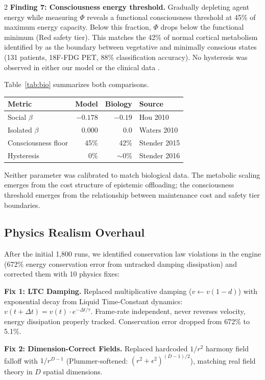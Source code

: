 \documentclass[letterpaper]{article}
\begin{document}
\begin{multicols}{2}
\textbf{Finding 7: Consciousness energy threshold.} Gradually depleting agent energy while measuring $\Phi$ reveals a functional consciousness threshold at 45\% of maximum energy capacity. Below this fraction, $\Phi$ drops below the functional minimum (Red safety tier). This matches the 42\% of normal cortical metabolism identified by \citet{stender2015} as the boundary between vegetative and minimally conscious states (131 patients, 18F-FDG PET, 88\% classification accuracy). No hysteresis was observed in either our model or the clinical data \citep{stender2016}.

Table~\ref{tab:bio} summarizes both comparisons.

\begingroup
\centering
\small
{}
\label{tab:bio}
\begin{tabular}{lrrl}
\toprule
Metric & Model & Biology & Source \\
\midrule
Social $\beta$ & $-0.178$ & $-0.19$ & Hou 2010 \\
Isolated $\beta$ & $0.000$ & $0.0$ & Waters 2010 \\
Consciousness floor & 45\% & 42\% & Stender 2015 \\
Hysteresis & 0\% & $\sim$0\% & Stender 2016 \\
\bottomrule
\end{tabular}
\endgroup

Neither parameter was calibrated to match biological data. The metabolic scaling emerges from the cost structure of epistemic offloading; the consciousness threshold emerges from the relationship between maintenance cost and safety tier boundaries.

\subsection{Physics Realism Overhaul}

After the initial 1,800 runs, we identified conservation law violations in the engine (672\% energy conservation error from untracked damping dissipation) and corrected them with 10 physics fixes:

\textbf{Fix 1: LTC Damping.} Replaced multiplicative damping ($v \leftarrow v(1-d)$) with exponential decay from Liquid Time-Constant dynamics: $v(t+\Delta t) = v(t) \cdot e^{-\Delta t/\tau}$. Frame-rate independent, never reverses velocity, energy dissipation properly tracked. Conservation error dropped from 672\% to 5.1\%.

\textbf{Fix 2: Dimension-Correct Fields.} Replaced hardcoded $1/r^2$ harmony field falloff with $1/r^{D-1}$ (Plummer-softened: $(r^2 + \epsilon^2)^{(D-1)/2}$), matching real field theory in $D$ spatial dimensions.


\end{multicols}
\end{document}
